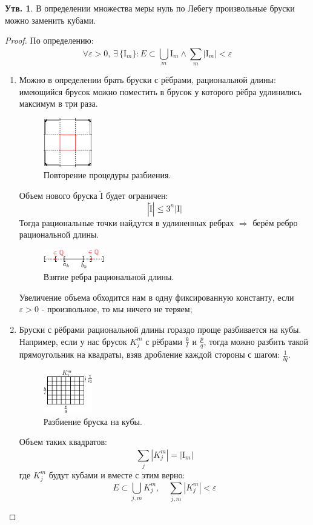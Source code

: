 \documentclass[12pt]{article}
\newcommand{\MI}{\mathrm{I}}
\newcommand{\VE}{\varepsilon}
\theoremstyle{definition}
\newtheorem{prop}{Утв.}
\newcommand{\ddsum}[2]{\displaystyle\sum\limits_{#1}^{#2}}
\newcommand{\wte}[1]{\widetilde{#1}}
\begin{document}
\begin{prop}
	В определении множества меры нуль по Лебегу произвольные бруски можно заменить кубами.
\end{prop}
\begin{proof}
	По определению:
	$$
		\forall \VE > 0, \, \exists\, \{\MI_m\} \colon E \subset \bigcup\limits_m\MI_m \wedge \ddsum{m}{}|\MI_m| < \VE
	$$
	\begin{enumerate}[label=\arabic*)]
		\item Можно в определении брать бруски с рёбрами, рациональной длины: имеющийся брусок можно поместить в брусок у которого рёбра удлинились максимум в три раза. 
		\begin{figure}[H]
			\centering
			\includegraphics[width=0.2\textwidth]{MA4L5_10.eps}
			\caption{Повторение процедуры разбиения.}
			\label{5_10}
		\end{figure}
		Объем нового бруска $\wte{\MI}$ будет ограничен:
		$$
			|\wte{\MI}| \leq 3^n|\MI|
		$$
		Тогда рациональные точки найдутся в удлиненных ребрах $\Rightarrow$ берём ребро рациональной длины.
		\begin{figure}[H]
			\centering
			\includegraphics[width=0.25\textwidth]{MA4L5_11.eps}
			\caption{Взятие ребра рациональной длины.}
			\label{5_11}
		\end{figure} 
		Увеличение объема обходится нам в одну фиксированную константу, если $\VE > 0$ - произвольное, то мы ничего не теряем;
		\item Бруски с рёбрами рациональной длины гораздо проще разбивается на кубы. Например, если у нас брусок $K_j^m$ с рёбрами $\tfrac{k}{l}$ и $\tfrac{p}{q}$, тогда можно разбить такой прямоугольник на квадраты, взяв дробление каждой стороны с шагом: $\tfrac{1}{lq}$. 
		\begin{figure}[H]
			\centering
			\includegraphics[width=0.2\textwidth]{MA4L5_12.eps}
			\caption{Разбиение бруска на кубы.}
			\label{5_12}
		\end{figure} 
		Объем таких квадратов:
		$$
			\ddsum{j}{}|K_j^m| = |\MI_m|
		$$
		где $K_j^m$ будут кубами и вместе с этим верно: 
		$$
			E \subset \bigcup\limits_{j,m} K_j^m, \quad \sum_{j,m}|K_j^m| < \VE
		$$
	\end{enumerate}
\end{proof}
\end{document}
